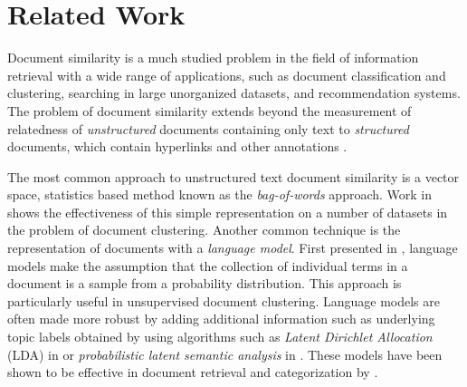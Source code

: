 \documentclass[11pt]{article}
\begin{document}
\section{Related Work} \label{sec:RelatedWork}

Document similarity is a much studied problem in the field of information retrieval with a wide range of applications, such as document classification and clustering, searching in large unorganized datasets, and recommendation systems. The problem of document similarity extends beyond the measurement of relatedness of \emph{unstructured} documents containing only text to \emph{structured} documents, which contain hyperlinks and other annotations \cite{Manning2008}. 

The most common approach to unstructured text document similarity is a vector space, statistics based method known as the  \emph{bag-of-words} approach. Work in \cite{Huang2008} shows the effectiveness of this simple representation on a number of datasets in the problem of document clustering. Another common technique is the representation of documents with a \emph{language model}. First presented in \cite{Ponte1998}, language models make the assumption that the collection of individual terms in a document is a sample from a probability distribution. This approach is particularly useful in unsupervised document clustering.  Language models are often made more robust by adding additional information such as underlying topic labels obtained by using algorithms such as \emph{Latent Dirichlet Allocation} (LDA) in \cite{Blei2003} or \emph{probabilistic latent semantic analysis} in \cite{Hofmann1999}.  These models have been shown to be effective in document retrieval and categorization by \cite{Hofmann2000}. 
\end{document}
